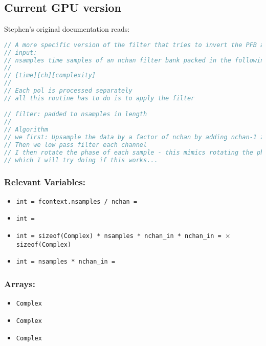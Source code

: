 \documentclass{article}
\begin{document}
\subsection{Current GPU version}

Stephen's original documentation reads:

\begin{lstlisting}[language=c,basicstyle=\footnotesize\ttfamily,commentstyle=\color{blue},frame=single,breaklines=true]
// A more specific version of the filter that tries to invert the PFB a bit more efficiently
// input:
// nsamples time samples of an nchan filter bank packed in the following order:
//
// [time][ch][complexity]
//
// Each pol is processed separately 
// all this routine has to do is to apply the filter

// filter: padded to nsamples in length
// 
// Algorithm   
// we first: Upsample the data by a factor of nchan by adding nchan-1 zeros to the streal
// Then we low pass filter each channel
// I then rotate the phase of each sample - this mimics rotating the phase of the synthesis filter
// which I will try doing if this works...
\end{lstlisting}

\subsubsection*{Relevant Variables:}

\begin{itemize}
    \item \texttt{int  = fcontext.nsamples / nchan = }
    \item \texttt{int  = }
    \item \texttt{int  = sizeof(Complex) * nsamples * nchan\_in * nchan\_in =  $\times$ sizeof(Complex)}
    \item \texttt{int  = nsamples * nchan\_in = }
\end{itemize}

\subsubsection*{Arrays:}

\begin{itemize}
    \item \texttt{Complex }
    \item \texttt{Complex }
    \item \texttt{Complex }
\end{itemize}
\end{document}
